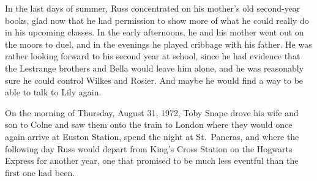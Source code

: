 In the last days of summer, Russ concentrated on his mother's old second-year books, glad now that he had permission to show more of what he could really do in his upcoming classes. In the early afternoons, he and his mother went out on the moors to duel, and in the evenings he played cribbage with his father. He was rather looking forward to his second year at school, since he had evidence that the Lestrange brothers and Bella would leave him alone, and he was reasonably sure he could control Wilkes and Rosier. And maybe he would find a way to be able to talk to Lily again.

On the morning of Thursday, August 31, 1972, Toby Snape drove his wife and son to Colne and saw them onto the train to London where they would once again arrive at Euston Station, spend the night at St.~Pancras, and where the following day Russ would depart from King's Cross Station on the Hogwarts Express for another year, one that promised to be much less eventful than the first one had been.


